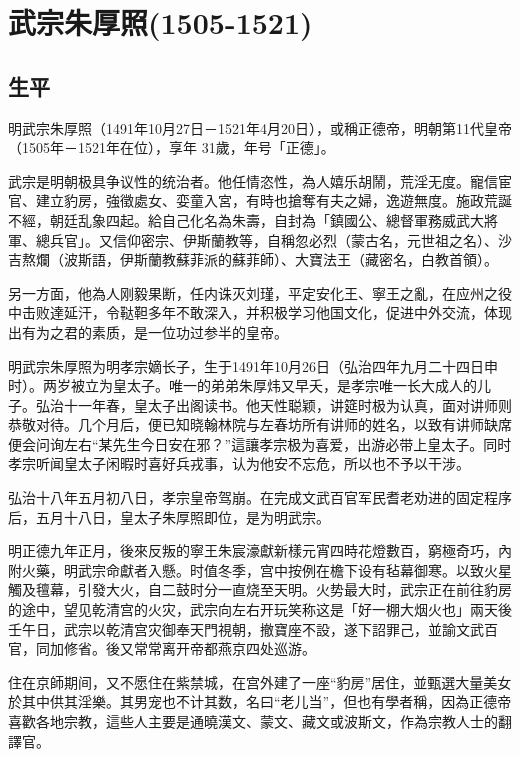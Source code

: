 
\section{武宗朱厚照\tiny(1505-1521)}

\subsection{生平}

明武宗朱厚照（1491年10月27日－1521年4月20日），或稱正德帝，明朝第11代皇帝（1505年－1521年在位），享年 31歲，年号「正德」。

武宗是明朝极具争议性的统治者。他任情恣性，為人嬉乐胡鬧，荒淫无度。寵信宦官、建立豹房，強徵處女、娈童入宮，有時也搶奪有夫之婦，逸遊無度。施政荒誕不經，朝廷乱象四起。給自己化名為朱壽，自封為「鎮國公、總督軍務威武大將軍、總兵官」。又信仰密宗、伊斯蘭教等，自稱忽必烈（蒙古名，元世祖之名）、沙吉熬爛（波斯語，伊斯蘭教蘇菲派的蘇菲師）、大寶法王（藏密名，白教首領）。

另一方面，他為人刚毅果断，任内诛灭刘瑾，平定安化王、寧王之亂，在应州之役中击败達延汗，令鞑靼多年不敢深入，并积极学习他国文化，促进中外交流，体现出有为之君的素质，是一位功过参半的皇帝。

明武宗朱厚照为明孝宗嫡长子，生于1491年10月26日（弘治四年九月二十四日申时）。两岁被立为皇太子。唯一的弟弟朱厚炜又早夭，是孝宗唯一长大成人的儿子。弘治十一年春，皇太子出阁读书。他天性聪颖，讲筵时极为认真，面对讲师则恭敬对待。几个月后，便已知晓翰林院与左春坊所有讲师的姓名，以致有讲师缺席便会问询左右“某先生今日安在邪？”這讓孝宗极为喜爱，出游必带上皇太子。同时孝宗听闻皇太子闲暇时喜好兵戎事，认为他安不忘危，所以也不予以干涉。

弘治十八年五月初八日，孝宗皇帝驾崩。在完成文武百官军民耆老劝进的固定程序后，五月十八日，皇太子朱厚照即位，是为明武宗。

明正德九年正月，後來反叛的寧王朱宸濠獻新樣元宵四時花燈數百，窮極奇巧，內附火藥，明武宗命獻者入懸。时值冬季，宫中按例在檐下设有毡幕御寒。以致火星觸及氊幕，引發大火，自二鼓时分一直烧至天明。火势最大时，武宗正在前往豹房的途中，望见乾清宫的火灾，武宗向左右开玩笑称这是「好一棚大烟火也」兩天後壬午日，武宗以乾清宫灾御奉天門視朝，撤寶座不設，遂下詔罪己，並諭文武百官，同加修省。後又常常离开帝都燕京四处巡游。

住在京師期间，又不愿住在紫禁城，在宫外建了一座“豹房”居住，並甄選大量美女於其中供其淫樂。其男宠也不计其数，名曰“老儿当”，但也有學者稱，因為正德帝喜歡各地宗教，這些人主要是通曉漢文、蒙文、藏文或波斯文，作為宗教人士的翻譯官。

